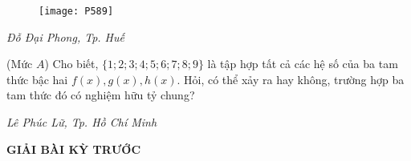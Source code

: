 \begin{multicols}{2}
\begin{figure}[H]
		\texttt{[image: P589]}
		\vspace*{-15pt}
	\end{figure}
	\begin{flushright}
		\textit{Đỗ Đại Phong, Tp. Huế}
	\end{flushright}
	{}
	(Mức $A$) Cho biết, $\{1;2;3;4;5;6;7;8;9\}$ là tập hợp tất cả các hệ số của ba tam thức bậc hai $f(x),g(x),h(x)$. Hỏi, có thể xảy ra hay không, trường hợp ba tam thức đó có nghiệm hữu tỷ chung?
	\begin{flushright}
		\textit{Lê Phúc Lữ, Tp. Hồ Chí Minh}
	\end{flushright}
\end{multicols}

\newpage
\begin{center}
	{\large{\textbf{\color{thachthuctoanhoc}\color{thachthuctoanhoc}GIẢI BÀI KỲ TRƯỚC}}}
\end{center}
